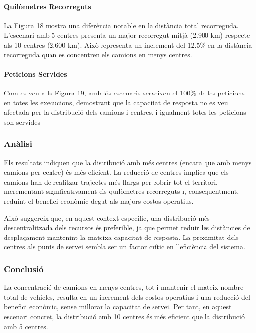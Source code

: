 \paragraph{Quilòmetres Recorreguts}

La Figura 18 mostra una diferència notable en la distància total recorreguda. L'escenari amb 5 centres presenta un major recorregut mitjà (2.900 km) respecte als 10 centres (2.600 km). Això representa un increment del 12.5\% en la distància recorreguda quan es concentren els camions en menys centres.


\paragraph{Peticions Servides}
Com es veu a la Figura 19, ambdós escenaris serveixen el 100\% de les peticions en totes les execucions, demostrant que la capacitat de resposta no es veu afectada per la distribució dels camions i centres, i igualment totes les peticions son servides


\vspace{0.5cm}


\subsubsection{Anàlisi}
Els resultats indiquen que la distribució amb més centres (encara que amb menys camions per centre) és més eficient. La reducció de centres implica que els camions han de realitzar trajectes més llargs per cobrir tot el territori, incrementant significativament els quilòmetres recorreguts i, conseqüentment, reduint el benefici econòmic degut als majors costos operatius.

Això suggereix que, en aquest context específic, una distribució més descentralitzada dels recursos és preferible, ja que permet reduir les distàncies de desplaçament mantenint la mateixa capacitat de resposta. La proximitat dels centres als punts de servei sembla ser un factor crític en l'eficiència del sistema.

\vspace{0.5cm}


\subsubsection{Conclusió}
La concentració de camions en menys centres, tot i mantenir el mateix nombre total de vehicles, resulta en un increment dels costos operatius i una reducció del benefici econòmic, sense millorar la capacitat de servei. Per tant, en aquest escenari concret, la distribució amb 10 centres és més eficient que la distribució amb 5 centres.

